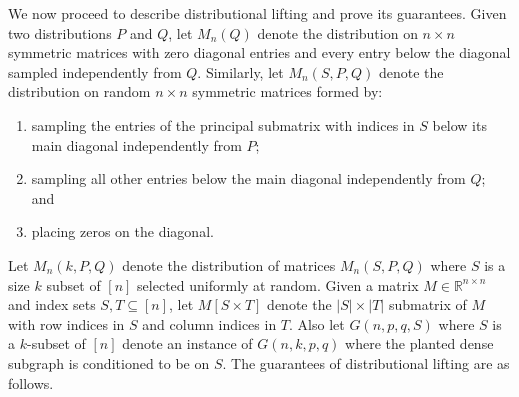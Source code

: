We now proceed to describe distributional lifting and prove its guarantees. Given two distributions $P$ and $Q$, let $M_n(Q)$ denote the distribution on $n \times n$ symmetric matrices with zero diagonal entries and every entry below the diagonal sampled independently from $Q$. Similarly, let $M_n(S, P, Q)$ denote the distribution on random $n \times n$ symmetric matrices formed by:
\begin{enumerate}
\item sampling the entries of the principal submatrix with indices in $S$ below its main diagonal independently from $P$;
\item sampling all other entries below the main diagonal independently from $Q$; and
\item placing zeros on the diagonal.
\end{enumerate}
Let $M_n(k, P, Q)$ denote the distribution of matrices $M_n(S, P, Q)$ where $S$ is a size $k$ subset of $[n]$ selected uniformly at random. Given a matrix $M \in \mathbb{R}^{n \times n}$ and index sets $S, T \subseteq [n]$, let $M[S \times T]$ denote the $|S| \times |T|$ submatrix of $M$ with row indices in $S$ and column indices in $T$. Also let $G(n, p, q, S)$ where $S$ is a $k$-subset of $[n]$ denote an instance of $G(n, k, p, q)$ where the planted dense subgraph is conditioned to be on $S$. The guarantees of distributional lifting are as follows.

